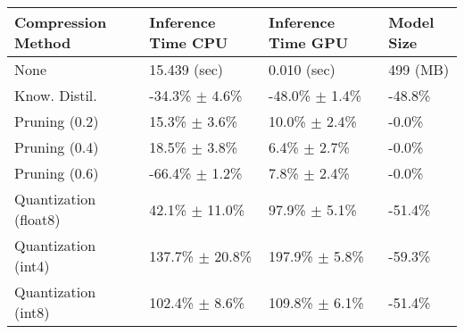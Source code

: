 \begin{tabular}{llll}
\toprule
\textbf{Compression Method} & \textbf{Inference Time CPU} & \textbf{Inference Time GPU} & \textbf{Model Size} \\
\midrule
None & 15.439 (sec) & 0.010 (sec) & 499 (MB) \\
Know. Distil. & -34.3\% $\pm$ 4.6\% & -48.0\% $\pm$ 1.4\% & -48.8\% \\
Pruning (0.2) & 15.3\% $\pm$ 3.6\% & 10.0\% $\pm$ 2.4\% & -0.0\% \\
Pruning (0.4) & 18.5\% $\pm$ 3.8\% & 6.4\% $\pm$ 2.7\% & -0.0\% \\
Pruning (0.6) & -66.4\% $\pm$ 1.2\% & 7.8\% $\pm$ 2.4\% & -0.0\% \\
Quantization (float8) & 42.1\% $\pm$ 11.0\% & 97.9\% $\pm$ 5.1\% & -51.4\% \\
Quantization (int4) & 137.7\% $\pm$ 20.8\% & 197.9\% $\pm$ 5.8\% & -59.3\% \\
Quantization (int8) & 102.4\% $\pm$ 8.6\% & 109.8\% $\pm$ 6.1\% & -51.4\% \\
\bottomrule
\end{tabular}
